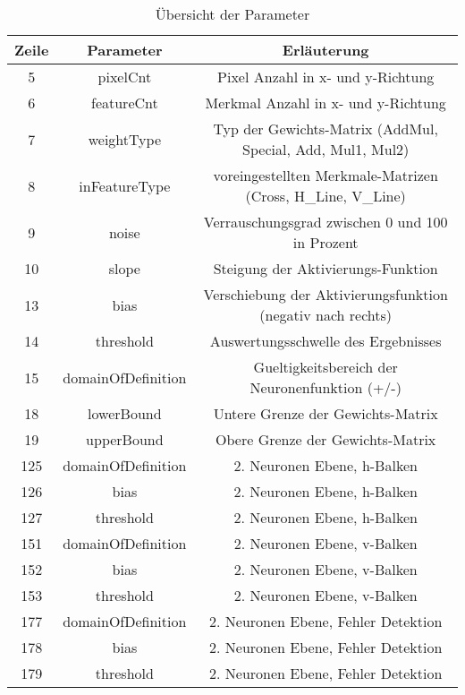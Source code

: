 \begin{table}[hbt]
	\centering
	\begin{tabular}{|c|c|c|}
		
		\hline 
		Zeile & Parameter & Erläuterung \\ 
		\hline 
		5 & pixelCnt & Pixel Anzahl in x- und y-Richtung \\ 
		\hline 
		6 & featureCnt & Merkmal Anzahl in x- und y-Richtung \\ 
		\hline 
		7 & weightType & Typ der Gewichts-Matrix (AddMul, Special, Add, Mul1, Mul2) \\ 
		\hline 
		8 & inFeatureType & voreingestellten Merkmale-Matrizen (Cross, H\_Line, V\_Line) \\ 
		\hline 
		9 & noise & Verrauschungsgrad zwischen 0 und 100 in Prozent \\ 
		\hline 
		10 & slope & Steigung der Aktivierungs-Funktion \\ 
		\hline 
		13 & bias & Verschiebung der Aktivierungsfunktion (negativ nach rechts) \\ 
		\hline 
		14 & threshold & Auswertungsschwelle des Ergebnisses \\ 
		\hline 
		15 & domainOfDefinition & Gueltigkeitsbereich der Neuronenfunktion (+/-) \\ 
		\hline 
		18 & lowerBound & Untere Grenze der Gewichts-Matrix \\ 
		\hline 
		19 & upperBound & Obere Grenze der Gewichts-Matrix \\ 
		\hline 
		125 & domainOfDefinition & 2. Neuronen Ebene, h-Balken \\ 
		\hline
		126 & bias & 2. Neuronen Ebene, h-Balken \\ 
		\hline 
		127 & threshold & 2. Neuronen Ebene, h-Balken \\ 
		\hline 
		151 & domainOfDefinition & 2. Neuronen Ebene, v-Balken \\ 
		\hline
		152 & bias & 2. Neuronen Ebene, v-Balken \\ 
		\hline 
		153 & threshold & 2. Neuronen Ebene, v-Balken \\ 
		\hline 
		177 & domainOfDefinition & 2. Neuronen Ebene, Fehler Detektion \\ 
		\hline
		178 & bias & 2. Neuronen Ebene, Fehler Detektion \\ 
		\hline 
		179 & threshold & 2. Neuronen Ebene, Fehler Detektion \\ 
		\hline 
		
	\end{tabular}
	\caption{Übersicht der Parameter}
	
	\label{ueParameter}
\end{table}
